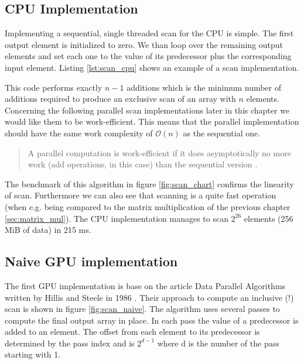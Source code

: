 \subsection{CPU Implementation}
\label{sec:scan_cpu}

Implementing a sequential, single threaded scan for the CPU is simple. The first output element is initialized to zero. We than loop over the remaining output elements and set each one to the value of its predecessor plus the corresponding input element. Listing \ref{lst:scan_cpu} shows an example of a scan implementation.



This code performs exactly $n - 1$ additions which is the minimum number of additions required to produce an exclusive scan of an array with $n$ elements. Concerning the following parallel scan implementations later in this chapter we would like them to be work-efficient. This means that the parallel implementation should have the same work complexity of $\mathcal{O}(n)$ as the sequential one.

\begin{quote}
A parallel computation is work-efficient if it does asymptotically no more work (add operations, in this case) than the sequential version \cite{gpu_gems_3_chapter_39}.
\end{quote}

The benchmark of this algorithm in figure \ref{fig:scan_chart} confirms the linearity of scan. Furthermore we can also see that scanning is a quite fast operation (when e.g. being compared to the matrix multiplication of the previous chapter \ref{sec:matrix_mul}). The CPU implementation manages to scan $2^{26}$ elements (256 MiB of data) in 215 ms.

\subsection{Naive GPU implementation}
\label{sec:scan_naive}

The first GPU implementation is base on the article Data Parallel Algorithms written by Hillis and Steele in 1986 \cite{scan_naive}. Their approach to compute an inclusive (!) scan is shown in figure \ref{fig:scan_naive}. The algorithm uses several passes to compute the final output array in place. In each pass the value of a predecessor is added to an element. The offset from each element to its predecessor is determined by the pass index and is $2^{d - 1}$ where d is the number of the pass starting with 1.

